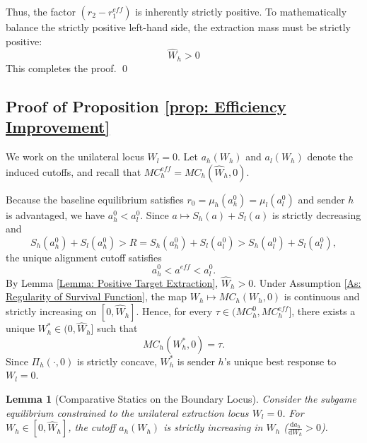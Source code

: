 \documentclass[12pt, a4paper]{article}
\newtheorem{lemma}{Lemma}
\begin{document}
Thus, the factor $(r_2 - r_1^{eff})$ is inherently strictly positive. To mathematically balance the strictly positive left-hand side, the extraction mass must be strictly positive:
$$ \hat{W}_h > 0 $$
This completes the proof. \qed

\subsection*{Proof of Proposition \ref{prop: Efficiency Improvement}}

We work on the unilateral locus $W_l=0$. Let $a_h(W_h)$ and $a_l(W_h)$ denote the induced cutoffs, and recall that $MC_h^{eff}=MC_h(\hat W_h,0)$.

Because the baseline equilibrium satisfies $r_0=\mu_h(a_h^0)=\mu_l(a_l^0)$ and sender $h$ is advantaged, we have $a_h^0<a_l^0$. Since $a \mapsto S_h(a)+S_l(a)$ is strictly decreasing and
\[
S_h(a_h^0)+S_l(a_h^0)>R=S_h(a_h^0)+S_l(a_l^0)>S_h(a_l^0)+S_l(a_l^0),
\]
the unique alignment cutoff satisfies
\[
a_h^0<a^{eff}<a_l^0.
\]
By Lemma \ref{Lemma: Positive Target Extraction}, $\hat W_h>0$. Under Assumption \ref{As: Regularity of Survival Function}, the map $W_h \mapsto MC_h(W_h,0)$ is continuous and strictly increasing on $[0,\hat W_h]$. Hence, for every $\tau \in (MC_h^0,MC_h^{eff}]$, there exists a unique $W_h^* \in (0,\hat W_h]$ such that
\[
MC_h(W_h^*,0)=\tau.
\]
Since $\Pi_h(\cdot,0)$ is strictly concave, $W_h^*$ is sender $h$'s unique best response to $W_l=0$.

\begin{lemma}[Comparative Statics on the Boundary Locus]
\label{lemma:MC_derivation}
Consider the subgame equilibrium constrained to the unilateral extraction locus $W_l=0$. For $W_h \in [0, \hat{W}_h]$, the cutoff $a_h(W_h)$ is strictly increasing in $W_h$ ($\frac{\mathrm{d}a_h}{\mathrm{d}W_h} > 0$).
\end{lemma}
\end{document}

